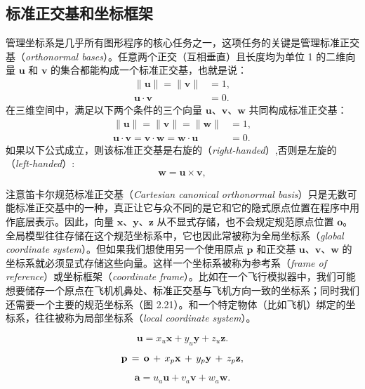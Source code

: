 \subsection{标准正交基和坐标框架}

管理坐标系是几乎所有图形程序的核心任务之一，这项任务的关键是管理标准正交基（\textit{orthonormal bases}）。任意两个正交（互相垂直）且长度均为单位 1 的二维向量 $\mathbf{u}$ 和 $\mathbf{v}$ 的集合都能构成一个标准正交基，也就是说：
\[
  \begin{aligned}
    \|\mathbf{u}\|=\|\mathbf{v}\| & =1, \\
    \mathbf{u}\cdot\mathbf{v}     & =0.
  \end{aligned}
\]
在三维空间中，满足以下两个条件的三个向量 $\mathbf{u}$、$\mathbf{v}$、$\mathbf{w}$ 共同构成标准正交基：
\[
  \begin{aligned}
    \|\mathbf{u}\|=\|\mathbf{v}\|=\|\mathbf{w}\|                                  & =1, \\
    \mathbf{u}\cdot\mathbf{v}=\mathbf{v}\cdot\mathbf{w}=\mathbf{w}\cdot\mathbf{u} & =0.
  \end{aligned}
\]
如果以下公式成立，则该标准正交基是右旋的（\textit{right-handed}）,否则是左旋的（\textit{left-handed}）:
\[
  \mathbf{w}=\mathbf{u}\times\mathbf{v},
\]

注意笛卡尔规范标准正交基（\textit{Cartesian canonical orthonormal basis}）只是无数可能标准正交基中的一种，真正让它与众不同的是它和它的隐式原点位置在程序中用作底层表示。因此，向量 $\mathbf{x}$、$\mathbf{y}$、$\mathbf{z}$ 从不显式存储，也不会规定规范原点位置 $\mathbf{o}$。全局模型往往存储在这个规范坐标系中，它也因此常被称为全局坐标系（\textit{global coordinate system}）。但如果我们想使用另一个使用原点 $\mathbf{p}$ 和正交基 $\mathbf{u}$、$\mathbf{v}$、$\mathbf{w}$ 的坐标系就必须显式存储这些向量。这样一个坐标系被称为参考系（\textit{frame of reference}）或坐标框架（\textit{coordinate frame}）。比如在一个飞行模拟器中，我们可能想要储存一个原点在飞机机鼻处、标准正交基与飞机方向一致的坐标系；同时我们还需要一个主要的规范坐标系（图 2.21）。和一个特定物体（比如飞机）绑定的坐标系，往往被称为局部坐标系（\textit{local coordinate system}）。



\[
  \mathbf{u}=x_{u}\mathbf{x}+y_{u}\mathbf{y}+z_{u}\mathbf{z}.
\]

\[
  {\bf p}\,=\,{\bf o}\,+\,x_{p}{\bf x}\,+\,y_{p}{\bf y}\,+\,z_{p}{\bf z},
\]

\[
  \mathbf{a}=u_{a}\mathbf{u}+v_{a}\mathbf{v}+w_{a}\mathbf{w}.
\]

